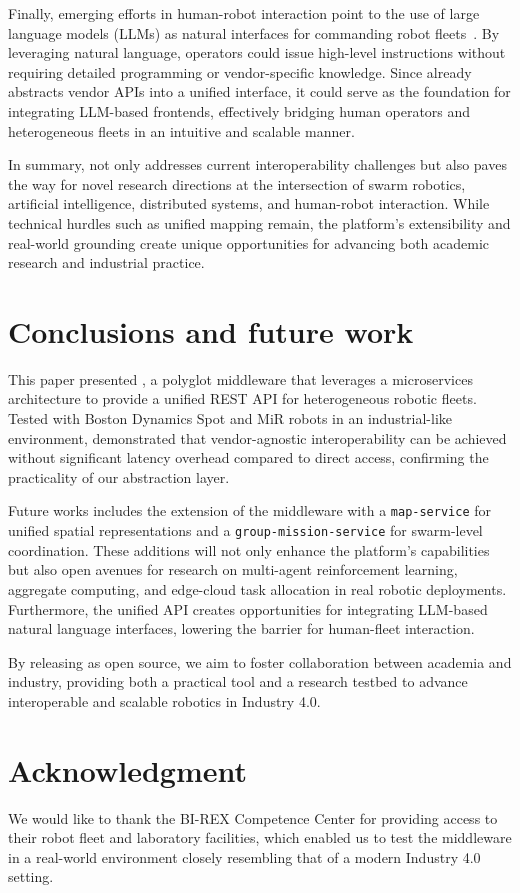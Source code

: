 \documentclass[conference]{IEEEtran}
\begin{document}
Finally, emerging efforts in human-robot interaction point to the use of large language models (LLMs) 
 as natural interfaces for commanding robot fleets~\cite{olaiya2025natural,aguzzi2025language}. 
% 
By leveraging natural language, operators could issue high-level instructions without requiring 
 detailed programming or vendor-specific knowledge. 
% 
Since \approach{} already abstracts vendor APIs into a unified interface, 
 it could serve as the foundation for integrating LLM-based frontends, 
 effectively bridging human operators and heterogeneous fleets in an intuitive and scalable manner.

In summary, \approach{} not only addresses current interoperability challenges 
 but also paves the way for novel research directions at the intersection of 
 swarm robotics, artificial intelligence, distributed systems, and human-robot interaction. 
% 
While technical hurdles such as unified mapping remain, 
 the platform's extensibility and real-world grounding create unique opportunities 
 for advancing both academic research and industrial practice.


\section{Conclusions and future work}\label{sec:future}

This paper presented \approach{}, 
 a polyglot middleware that leverages a microservices architecture to provide a unified REST API 
 for heterogeneous robotic fleets. 
% 
Tested with Boston Dynamics Spot and MiR robots in an industrial-like environment, 
 \approach{} demonstrated that vendor-agnostic interoperability can be achieved 
 without significant latency overhead compared to direct access, 
 confirming the practicality of our abstraction layer.

Future works includes the extension of the middleware with a \texttt{map-service} 
 for unified spatial representations and a \texttt{group-mission-service} 
 for swarm-level coordination. 
% 
These additions will not only enhance the platform's capabilities 
 but also open avenues for research on multi-agent reinforcement learning, aggregate computing, 
 and edge-cloud task allocation in real robotic deployments. 
% 
Furthermore, the unified API creates opportunities for integrating LLM-based natural language interfaces, 
 lowering the barrier for human-fleet interaction.

By releasing \approach{} as open source, 
 we aim to foster collaboration between academia and industry, 
 providing both a practical tool and a research testbed 
 to advance interoperable and scalable robotics in Industry 4.0.


\section*{Acknowledgment}
We would like to thank the BI-REX Competence Center for providing access to their robot fleet and 
 laboratory facilities, which enabled us to test the middleware in a real-world environment closely 
  resembling that of a modern Industry 4.0 setting.




\end{document}
